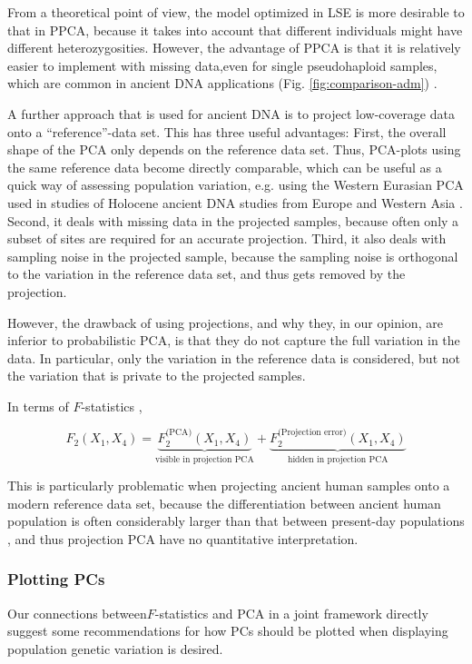 \documentclass[12pt]{article}
\begin{document}
From a theoretical point of view, the model optimized in LSE is more desirable to that in PPCA, because it takes into account that different individuals might have different heterozygosities. However, the advantage of PPCA is that it is relatively easier to implement with missing data,even for single pseudohaploid samples, which are common in ancient DNA applications (Fig. \ref{fig:comparison-adm}) \citep{tipping_probabilistic_1999-1, orlando_ancient_2021}. 


A further approach that is used for ancient DNA is to project low-coverage data onto a ``reference''-data set. This has three useful advantages: First, the overall shape of the PCA only depends on the reference data set. Thus, PCA-plots using the same reference data become directly comparable, which can be useful as a quick way of assessing population variation, e.g. using the Western Eurasian PCA used in studies of Holocene ancient DNA studies from Europe and Western Asia \citep{haak_massive_2015}. Second, it deals with missing data in the projected samples, because often only a subset of sites are required for an accurate projection. Third, it also deals with sampling noise in the projected sample, because the sampling noise is orthogonal to the variation in the reference data set, and thus gets removed by the projection.

However, the drawback of using projections, and why they, in our opinion, are inferior to probabilistic PCA, is that they do not capture the full variation in the data. In particular, only the variation in the reference data is considered, but not the variation that is private to the projected samples. 

In terms of $F$-statistics \citep{peter_geometric_2022}, 

\begin{equation*}
    F_2(X_1, X_4) = \underbrace{F_2^{\text{(PCA)}}(X_1, X_4)}_{\text{visible in projection PCA}} + \underbrace{F_2^{\text{(Projection error)}}(X_1, X_4)}_{\text{hidden in projection PCA}}
\end{equation*}

This is particularly problematic when projecting ancient human samples onto a modern reference data set, because the differentiation between ancient human population is often considerably larger than that between present-day populations \citep{haak_massive_2015, lazaridis_ancient_2014}, and thus projection PCA have no quantitative interpretation.


\subsubsection{Plotting PCs}
Our connections between$F$-statistics and PCA in a joint framework directly suggest some recommendations for how PCs should be plotted when displaying population genetic variation is desired. 
\end{document}
